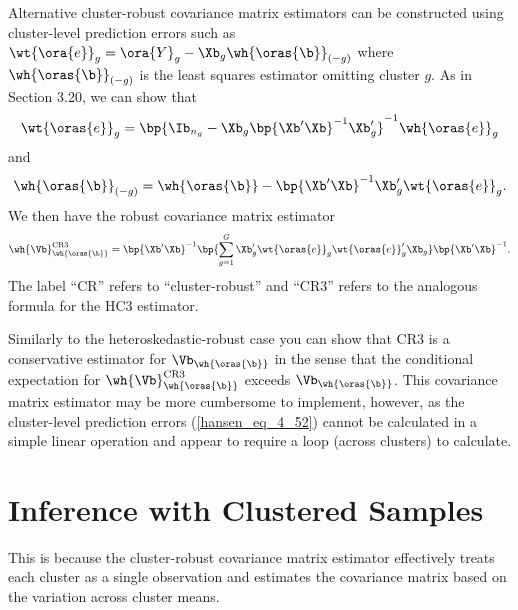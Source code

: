 Alternative cluster-robust covariance matrix estimators can be constructed using cluster-level prediction errors such as $\wt{\ora{e}}_g = \ora{Y}_g - \Xb_g \wh{\oras{\b}}_{(-g)}$ where $\wh{\oras{\b}}_{(-g)}$ is the least squares estimator omitting cluster $g$. As in Section 3.20, we can show that 
\begin{equation}
    \label{hansen_eq_4_52}
    \wt{\oras{e}}_g = \bp{\Ib_{n_g} - \Xb_g \bp{\Xb^\prime \Xb}^{-1} \Xb_g^\prime}^{-1} \wh{\oras{e}}_g
\end{equation}
and 
\begin{equation}
    \label{hansen_eq_4_53}
    \wh{\oras{\b}}_{(-g)} = \wh{\oras{\b}} - \bp{\Xb^\prime \Xb}^{-1}\Xb_g^\prime\wt{\oras{e}}_g .
\end{equation}
We then have the robust covariance matrix estimator
\begin{equation}
    \label{hansen_eq_4_54}
    \wh{\Vb}_{\wh{\oras{\b}}}^{\text{CR3}} = \bp{\Xb^\prime \Xb}^{-1} \bp{\sum_{g=1}^{G} \Xb_g^\prime \wt{\oras{e}}_g \wt{\oras{e}}_g^\prime \Xb_g} \bp{\Xb^\prime \Xb}^{-1}.
\end{equation}
The label ``CR'' refers to ``cluster-robust'' and ``CR3'' refers to the analogous formula for the HC3 estimator.

Similarly to the heteroskedastic-robust case you can show that CR3 is a conservative estimator for $\Vb_{\wh{\oras{\b}}}$ in the sense that the conditional expectation for $\wh{\Vb}_{\wh{\oras{\b}}}^{\text{CR3}}$ exceeds $\Vb_{\wh{\oras{\b}}}$. This covariance matrix estimator may be more cumbersome to implement, however, as the cluster-level prediction errors (\ref{hansen_eq_4_52}) cannot be calculated in a simple linear operation and appear to require a loop (across clusters) to calculate.

\section{Inference with Clustered Samples}


 This is because the cluster-robust covariance matrix estimator effectively treats each cluster as a single observation and estimates the covariance matrix based on the variation across cluster means.


